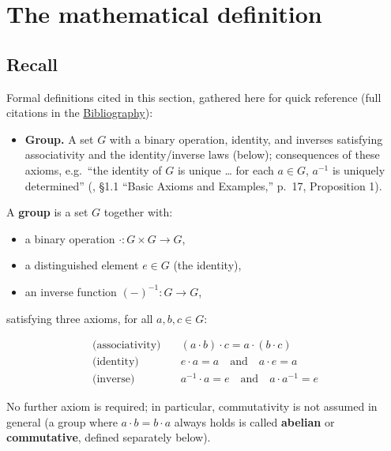 \section{The mathematical definition}\label{sec:06-groups:01-definition:1}

\subsection{Recall}\label{sec:06-groups:01-definition:2}

Formal definitions cited in this section, gathered here for quick reference (full citations in the \hyperref[sec:root:bibliography:1]{Bibliography}):

\begin{itemize}
\tightlist
\item
  \textbf{Group.} A set \(G\) with a binary operation, identity, and inverses satisfying associativity and the identity/inverse laws (below); consequences of these axioms, e.g.~``the identity of \(G\) is unique \ldots{} for each \(a \in G\), \(a^{-1}\) is uniquely determined'' (\cite{DummitFoote2003}, §1.1 ``Basic Axioms and Examples,'' p.~17, Proposition 1).
\end{itemize}

A \textbf{group} is a set \(G\) together with:

\begin{itemize}
\tightlist
\item
  a binary operation \(\cdot : G \times G \to G\),
\item
  a distinguished element \(e \in G\) (the identity),
\item
  an inverse function \((-)^{-1} : G \to G\),
\end{itemize}

satisfying three axioms, for all \(a, b, c \in G\):

\[
\begin{aligned}
\text{(associativity)} &\quad (a \cdot b) \cdot c = a \cdot (b \cdot c) \\
\text{(identity)} &\quad e \cdot a = a \quad\text{and}\quad a \cdot e = a \\
\text{(inverse)} &\quad a^{-1} \cdot a = e \quad\text{and}\quad a \cdot a^{-1} = e
\end{aligned}
\]

No further axiom is required; in particular, commutativity is not assumed in general (a group where \(a \cdot b = b \cdot a\) always holds is called \textbf{abelian} or \textbf{commutative}, defined separately below).

